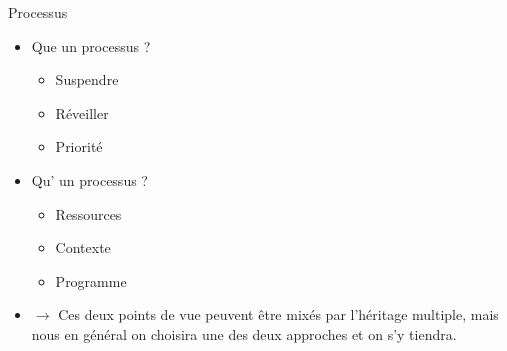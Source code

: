  Processus
\begin{itemize}
	\item Que  un processus ?
	\begin{itemize}	
		\item Suspendre
		\item Réveiller
		\item Priorité
	\end{itemize}
	\item Qu' un processus ? 
	\begin{itemize}
		\item Ressources
		\item Contexte
		\item Programme
	\end{itemize}
	\item $\rightarrow$ Ces deux points de vue peuvent être mixés par l'héritage multiple, mais nous en général on choisira une des deux approches et on s'y tiendra.
\end{itemize}
